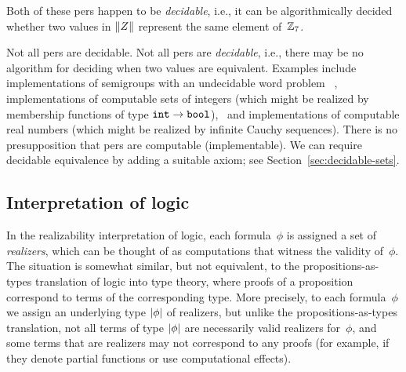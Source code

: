 Both of these pers happen to be \emph{decidable}, i.e., it can be
algorithmically decided whether two values in $\|Z\|$ represent the same element
of~$\mathbb{Z}_7$.\fi %

\iflong
%
Not all pers are decidable.
%
\else
%
Not all pers are \emph{decidable}, i.e., there may be no algorithm for deciding
when two values are equivalent.
%
\fi
%
Examples include implementations of semigroups with an undecidable
word problem~\cite{post47:_recur_unsol_probl_thue}%
\iflong, implementations of computable sets of integers (which might
be realized by membership functions of type $\mathtt{int}\to\mathtt{bool}$),\fi
\ and implementations of computable real numbers (which might be
realized by infinite Cauchy sequences).
%
\iflong
%
There is no presupposition that pers are computable
(implementable). We can require decidable equivalence by adding a
suitable axiom; see Section~\ref{sec:decidable-sets}. \fi

\subsection{Interpretation of logic}
\label{sec:interpretation-logic}

In the realizability interpretation of logic, each formula~$\phi$ is
assigned a set of \emph{realizers}, which can be thought of as
computations that witness the validity of~$\phi$. The situation is
somewhat similar, but not equivalent, to the propositions-as-types
translation of logic into type theory, where proofs of a
proposition correspond to terms of the corresponding type. More
precisely, to each formula~$\phi$ we assign an underlying type
$|\phi|$ of realizers, but unlike the propositions-as-types
translation, not all terms of type $|\phi|$ are necessarily
valid realizers for~$\phi$, and some terms that are realizers may not
correspond to any proofs (for example, if they denote partial
functions or use computational effects).

